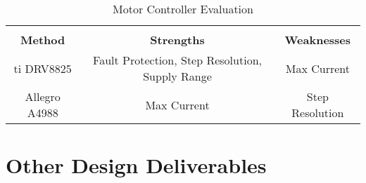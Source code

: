 \begin{table}[ht]
	\caption{Motor Controller Evaluation}
	\label{table:MCEval}
	\centering
	\begin{tabular}{c c c}
	\hline \hline \\
		\textbf{Method} & \textbf{Strengths} & \textbf{Weaknesses}\\
		\gls{ti} DRV8825 & Fault Protection, Step Resolution, Supply Range & Max Current\\
		Allegro A4988 & Max Current & Step Resolution\\
	\end{tabular}
\end{table}

\section{Other Design Deliverables}